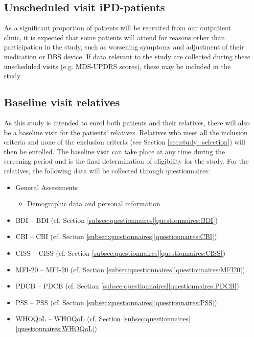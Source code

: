 \subsection{Unscheduled visit \ac{iPD}-patients}
As a significant proportion of patients will be recruited from our outpatient clinic, it is expected that some patients will attend for reasons other than participation in the study, such as worsening symptoms and adjustment of their medication or \ac{DBS} device. If data relevant to the study are collected during these unscheduled visits (e.g. \ac{MDS-UPDRS} scores), these may be included in the study.
 
\subsection{Baseline visit relatives}
As this study is intended to enrol both patients and their relatives, there will also be a baseline visit for the patients' relatives. Relatives who meet all the inclusion criteria and none of the exclusion criteria (see Section \ref{sec:study_selection}) will then be enrolled. The baseline visit can take place at any time during the screening period and is the final determination of eligibility for the study. For the relatives, the following data will be collected through questionnaires:

\begin{itemize}[noitemsep,topsep=0pt]
\item General Assessments
\begin{itemize}[noitemsep,topsep=0pt]
\item Demographic data and personal information
\end{itemize}
\item \acl{BDI} -- \acs{BDI} (cf. Section \ref{subsec:questionnaires}\ref{questionnaires:BDI})
\item \acl{CBI} -- \acs{CBI} (cf. Section \ref{subsec:questionnaires}\ref{questionnaires:CBI})
\item \acl{CISS} -- \acs{CISS} (cf. Section \ref{subsec:questionnaires}\ref{questionnaires:CISS})
\item \acl{MFI-20} -- \acs{MFI-20} (cf. Section \ref{subsec:questionnaires}\ref{questionnaires:MFI20})
\item \acl{PDCB} -- \acs{PDCB} (cf. Section \ref{subsec:questionnaires}\ref{questionnaires:PDCB})
\item \acl{PSS} -- \acs{PSS} (cf. Section \ref{subsec:questionnaires}\ref{questionnaires:PSS})
\item \acl{WHOQoL} -- \acs{WHOQoL} (cf. Section \ref{subsec:questionnaires}\ref{questionnaires:WHOQoL})
\end{itemize}


